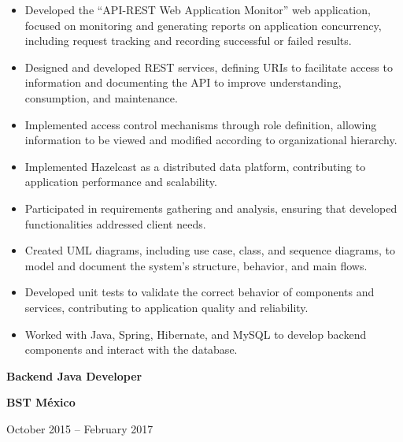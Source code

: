 \documentclass[10pt,letterpaper]{article}
\newcommand{\jobtitle}[1]{
    {\bfseries #1}
}
\newcommand{\company}[1]{
    {\bfseries\color{DarkGray} #1}
}
\newcommand{\jobdate}[1]{
    {\color{MediumGray} #1}
}
\begin{document}
\begin{itemize}

    \item Developed the ``API-REST Web Application Monitor'' web application, focused on monitoring and generating reports on application concurrency, including request tracking and recording successful or failed results.

    \item Designed and developed REST services, defining URIs to facilitate access to information and documenting the API to improve understanding, consumption, and maintenance.

    \item Implemented access control mechanisms through role definition, allowing information to be viewed and modified according to organizational hierarchy.

    \item Implemented Hazelcast as a distributed data platform, contributing to application performance and scalability.

    \item Participated in requirements gathering and analysis, ensuring that developed functionalities addressed client needs.

    \item Created UML diagrams, including use case, class, and sequence diagrams, to model and document the system's structure, behavior, and main flows.

    \item Developed unit tests to validate the correct behavior of components and services, contributing to application quality and reliability.

    \item Worked with Java, Spring, Hibernate, and MySQL to develop backend components and interact with the database.

\end{itemize}


\jobtitle{Backend Java Developer} \textbar{}
\company{BST México}
\hfill \textbar{}
\jobdate{October 2015 -- February 2017}
\end{document}
